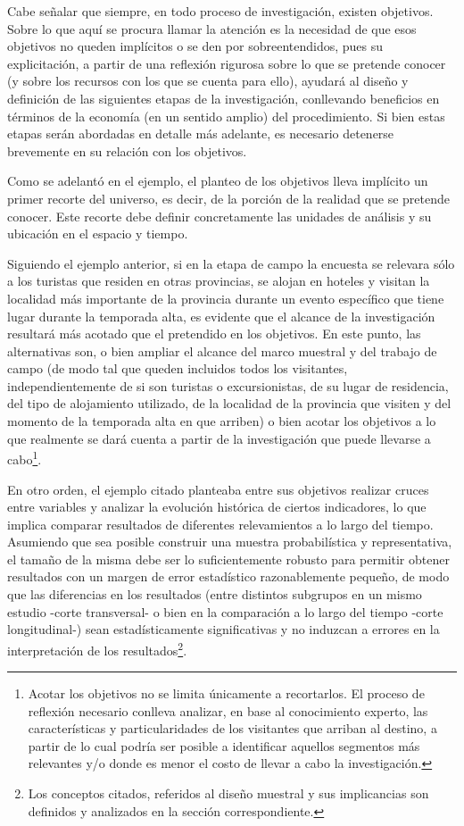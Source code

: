 \documentclass[
]{book}
\begin{document}
Cabe señalar que siempre, en todo proceso de investigación, existen objetivos. Sobre lo que aquí se procura llamar la atención es la necesidad de que esos objetivos no queden implícitos o se den por sobreentendidos, pues su explicitación, a partir de una reflexión rigurosa sobre lo que se pretende conocer (y sobre los recursos con los que se cuenta para ello), ayudará al diseño y definición de las siguientes etapas de la investigación, conllevando beneficios en términos de la economía (en un sentido amplio) del procedimiento. Si bien estas etapas serán abordadas en detalle más adelante, es necesario detenerse brevemente en su relación con los objetivos.

Como se adelantó en el ejemplo, el planteo de los objetivos lleva implícito un primer recorte del universo, es decir, de la porción de la realidad que se pretende conocer. Este recorte debe definir concretamente las unidades de análisis y su ubicación en el espacio y tiempo.

Siguiendo el ejemplo anterior, si en la etapa de campo la encuesta se relevara sólo a los turistas que residen en otras provincias, se alojan en hoteles y visitan la localidad más importante de la provincia durante un evento específico que tiene lugar durante la temporada alta, es evidente que el alcance de la investigación resultará más acotado que el pretendido en los objetivos. En este punto, las alternativas son, o bien ampliar el alcance del marco muestral y del trabajo de campo (de modo tal que queden incluidos todos los visitantes, independientemente de si son turistas o excursionistas, de su lugar de residencia, del tipo de alojamiento utilizado, de la localidad de la provincia que visiten y del momento de la temporada alta en que arriben) o bien acotar los objetivos a lo que realmente se dará cuenta a partir de la investigación que puede llevarse a cabo\footnote{Acotar los objetivos no se limita únicamente a recortarlos. El proceso de reflexión necesario conlleva analizar, en base al conocimiento experto, las características y particularidades de los visitantes que arriban al destino, a partir de lo cual podría ser posible a identificar aquellos segmentos más relevantes y/o donde es menor el costo de llevar a cabo la investigación.}.

En otro orden, el ejemplo citado planteaba entre sus objetivos realizar cruces entre variables y analizar la evolución histórica de ciertos indicadores, lo que implica comparar resultados de diferentes relevamientos a lo largo del tiempo. Asumiendo que sea posible construir una muestra probabilística y representativa, el tamaño de la misma debe ser lo suficientemente robusto para permitir obtener resultados con un margen de error estadístico razonablemente pequeño, de modo que las diferencias en los resultados (entre distintos subgrupos en un mismo estudio -corte transversal- o bien en la comparación a lo largo del tiempo -corte longitudinal-) sean estadísticamente significativas y no induzcan a errores en la interpretación de los resultados\footnote{Los conceptos citados, referidos al diseño muestral y sus implicancias son definidos y analizados en la sección correspondiente.}.
\end{document}
